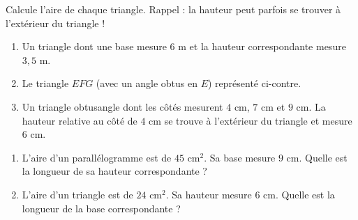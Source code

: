 \documentclass[a4paper]{book}
\begin{document}
    
    \begin{exercice}
        Calcule l'aire de chaque triangle. Rappel : la hauteur peut parfois se trouver à l'extérieur du triangle !

        \begin{minipage}{0.60\linewidth}
            \begin{enumerate}
                \item Un triangle dont une base mesure $6\text{ m}$ et la hauteur correspondante mesure $3,5\text{ m}$.
                \item Le triangle $EFG$ (avec un angle obtus en $E$) représenté ci-contre.
                 \item Un triangle obtusangle dont les côtés mesurent $4\text{ cm}$, $7\text{ cm}$ et $9\text{ cm}$. La hauteur relative au côté de $4\text{ cm}$ se trouve à l'extérieur du triangle et mesure $6\text{ cm}$.
            \end{enumerate}
        \end{minipage}
        \hfill
        \begin{minipage}{0.35\linewidth}
            \begin{center}
            \end{center}
        \end{minipage}
    \end{exercice}
    
    
    \begin{exercice}
        \begin{enumerate}
            \item L'aire d'un parallélogramme est de $45\text{ cm}^2$. Sa base mesure $9\text{ cm}$. Quelle est la longueur de sa hauteur correspondante ?
            \item L'aire d'un triangle est de $24\text{ cm}^2$. Sa hauteur mesure $6\text{ cm}$. Quelle est la longueur de la base correspondante ?
        \end{enumerate}
    \end{exercice}
    
\end{document}
